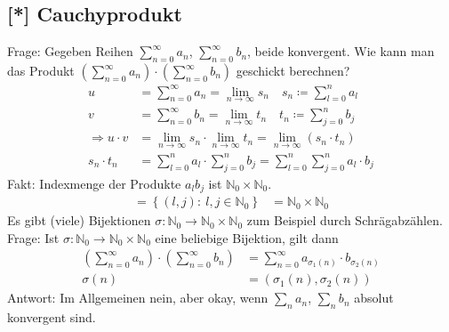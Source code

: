 \documentclass[11pt, twoside, a4paper]{article}
\theoremstyle{plain}
\newcommand{\set}[1]{\left\{#1\right\}}
\newcommand{\pair}[1]{\left(#1\right)}
\newcommand{\impl}[0]{\Rightarrow{}}
\newcommand{\fromto}{\rightarrow{}}
\newcommand{\definedas}[0]{\coloneqq}
\newcommand{\N}{\mathbb{N}}
\begin{document}
    \subsection{[*] Cauchyprodukt}
    Frage: Gegeben Reihen $\sum_{n=0}^{\infty} a_n$, $\sum_{n=0}^{\infty} b_n$, beide konvergent. Wie kann man das Produkt $\pair{\sum_{n=0}^{\infty} a_n}\cdot\pair{\sum_{n=0}^{\infty} b_n}$ geschickt berechnen?\\
    \begin{align*}
        u &= \sum_{n=0}^{\infty} a_n = \lim_{n\fromto\infty} s_n\quad s_n \definedas \sum_{l=0}^{n} a_l\\
        v &= \sum_{n=0}^{\infty} b_n = \lim_{n\fromto\infty} t_n \quad t_n \definedas \sum_{j=0}^{n} b_j\\
        \impl u\cdot v &= \lim_{n\fromto\infty} s_n \cdot \lim_{n\fromto\infty} t_n = \lim_{n\fromto\infty} \pair{s_n\cdot t_n}\\[10pt]
        s_n \cdot t_n &= \sum_{l=0}^{n} a_l \cdot \sum_{j=0}^{n} b_j = \sum_{l=0}^{n} \sum_{j=0}^{n} a_l\cdot b_j
    \end{align*}
    Fakt: Indexmenge der Produkte $a_l b_j$ ist $\N_0 \times \N_0$.
    \begin{align*}
        = \set{(l,j):~l,j\in\N_0} &= \N_0\times\N_0
    \end{align*}
    Es gibt (viele) Bijektionen $\sigma: \N_0 \fromto \N_0\times\N_0$ zum Beispiel durch Schrägabzählen.\\
    Frage: Ist $\sigma: \N_0 \fromto \N_0\times\N_0$ eine beliebige Bijektion, gilt dann
    \begin{align*}
        \pair{\sum_{n=0}^{\infty} a_n}\cdot\pair{\sum_{n=0}^{\infty} b_n} &= \sum_{n=0}^{\infty} a_{\sigma_1(n)}\cdot b_{\sigma_2(n)}\\
        \sigma(n) &= \pair{\sigma_1(n), \sigma_2(n)}
    \end{align*}
    Antwort: Im Allgemeinen nein, aber okay, wenn $\sum_{n}^{} a_n$, $\sum_{n}^{} b_n$ absolut konvergent sind.
\end{document}
